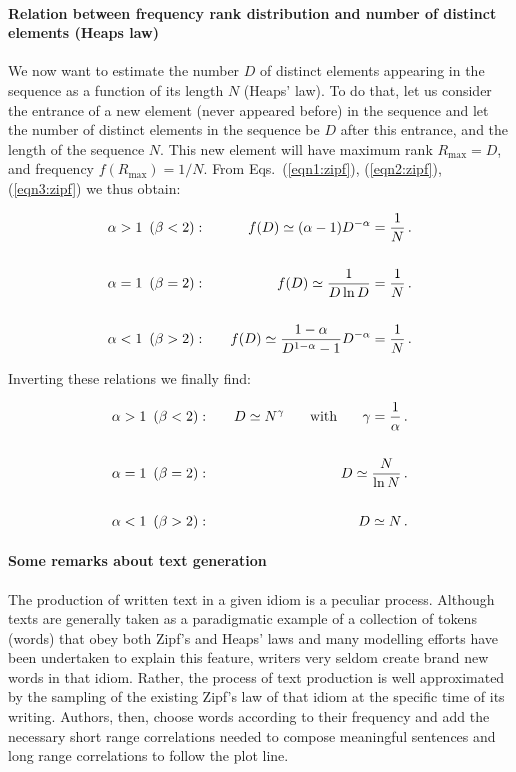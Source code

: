 \documentclass[graybox]{svmult}
\newcommand{\vito}[1]{{\color{red} vito: #1}}
\begin{document}
\paragraph{\textbf{Relation between frequency rank distribution and number of distinct elements (Heaps law)}}

We now want to estimate the number $D$ of distinct elements appearing in the sequence as a function of its length $N$
(Heaps' law). To do that, let us consider the entrance of a new element (never appeared before) in the sequence and let the number of distinct elements in the sequence be $D$  after this entrance, and the length of the sequence $N$. This new element will have maximum rank $R_{\max} =D$, and frequency $f(  R_{\max}) = 1/N$.  
From Eqs.~(\ref{eqn1:zipf}), (\ref{eqn2:zipf}), (\ref{eqn3:zipf}) we thus obtain:

\begin{eqnarray}
\alpha >1 \,\,\, (\beta<2): && \,\,\,\,\,\,
f(D) \simeq  (\alpha -1)  D^{-\alpha}  = \frac{1}{N}\,. \\
&& \nonumber \\
\alpha = 1  \,\,\,  (\beta=2): &&\,\,\,\,\,\,
 f(D) \simeq \frac {1} {D \ln{D}} = \frac{1}{N}\,. \\
&& \nonumber \\
\alpha<1\,\,\,  (\beta>2): && \,\,\,\,\,\, 
 f(D) \simeq \frac {1-\alpha}{D^{1-\alpha} -1}  D^{-\alpha} = \frac{1}{N} \,.
\end{eqnarray}

\noindent Inverting these relations we finally find:

\begin{eqnarray}
\alpha >1 \,\,\, (\beta<2): && \,\,\,\,\,\,
D \simeq N^{\gamma} \,\,\,\,\,\,\,\,\,\,\, \text{with} \,\,\,\,\,\,\,\,\,\,\,  \gamma= \frac{1}{\alpha}\,. \label{eqn1:heaps}\\
&& \nonumber \\
\alpha = 1  \,\,\,  (\beta=2): &&\,\,\,\,\,\,
 D \simeq \frac{N}{\ln{N}}\,. \label{eqn2:heaps}\\
&& \nonumber \\
\alpha<1\,\,\,  (\beta>2): && \,\,\,\,\,\, 
 D \simeq N \,.\label{eqn3:heaps}
\end{eqnarray}
%
%
\paragraph{\textbf{Some remarks about text generation}}
The production of written text in a given idiom is a peculiar process.
Although texts are generally taken as a paradigmatic example of a collection of tokens (words) that obey both Zipf's and Heaps' laws and many modelling efforts have been undertaken to explain this feature, writers very seldom create brand new words in that idiom.
Rather, the process of text production is well approximated by the sampling of the existing Zipf's law of that idiom at the specific time of its writing.
Authors, then, choose words according to their frequency and add the necessary short range correlations needed to compose meaningful sentences and long range correlations to follow the plot line.
\end{document}
